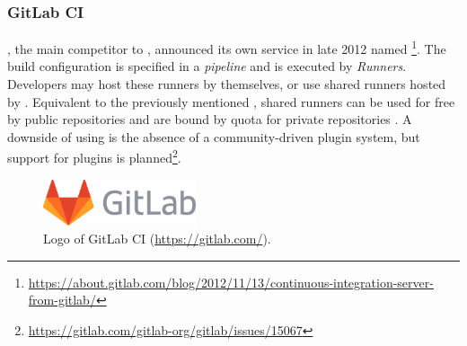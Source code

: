 
\subsubsection{GitLab CI}
\gitlab{}, the main competitor to \github{}, announced its own \CI{} service in late 2012 named \gitlabci{}\footnote{\url{https://about.gitlab.com/blog/2012/11/13/continuous-integration-server-from-gitlab/}}. The build configuration is specified in a \emph{pipeline} and is executed by \emph{\gitlab{} Runners}. Developers may host these runners by themselves, or use shared runners hosted by \gitlab{}  \cite{ciusinggitlab}. Equivalent to the previously mentioned \githubactions{}, shared runners can be used for free by public repositories and are bound by quota for private repositories \cite{gitlabdocs}. A downside of using \gitlabci{} is the absence of a community-driven plugin system, but support for plugins is planned\footnote{\url{https://gitlab.com/gitlab-org/gitlab/issues/15067}}.

\begin{figure}[htbp!]
	\centering
	\includegraphics[width=0.40\textwidth]{assets/images/gitlab.pdf}
	\caption{Logo of GitLab CI (\url{https://gitlab.com/}).}
	\label{fig:gitlab-ci}
\end{figure}